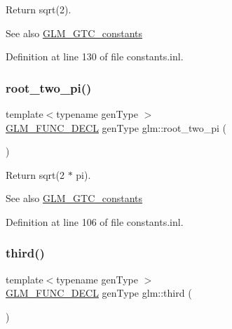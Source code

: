 Return sqrt(2). \begin{DoxySeeAlso}{See also}
\hyperlink{group__gtc__constants}{G\+L\+M\+\_\+\+G\+T\+C\+\_\+constants} 
\end{DoxySeeAlso}


Definition at line 130 of file constants.\+inl.

\mbox{\label{group__gtc__constants_gae991b4d39c57b57990054eec3677597c}} 
\subsubsection{\texorpdfstring{root\+\_\+two\+\_\+pi()}{root\_two\_pi()}}
{\footnotesize\ttfamily template$<$typename gen\+Type $>$ \\
\hyperlink{setup_8hpp_ab2d052de21a70539923e9bcbf6e83a51}{G\+L\+M\+\_\+\+F\+U\+N\+C\+\_\+\+D\+E\+CL} gen\+Type glm\+::root\+\_\+two\+\_\+pi (\begin{DoxyParamCaption}{ }\end{DoxyParamCaption})}

Return sqrt(2 $\ast$ pi). \begin{DoxySeeAlso}{See also}
\hyperlink{group__gtc__constants}{G\+L\+M\+\_\+\+G\+T\+C\+\_\+constants} 
\end{DoxySeeAlso}


Definition at line 106 of file constants.\+inl.

\mbox{\label{group__gtc__constants_gabf280496105e0ad070287417f840ebd8}} 
\subsubsection{\texorpdfstring{third()}{third()}}
{\footnotesize\ttfamily template$<$typename gen\+Type $>$ \\
\hyperlink{setup_8hpp_ab2d052de21a70539923e9bcbf6e83a51}{G\+L\+M\+\_\+\+F\+U\+N\+C\+\_\+\+D\+E\+CL} gen\+Type glm\+::third (\begin{DoxyParamCaption}{ }\end{DoxyParamCaption})}

